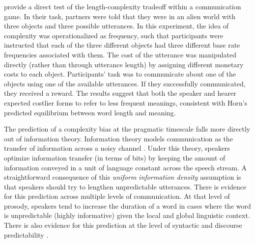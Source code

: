   provide a direct test of the length-complexity tradeoff within a communication game. In their task, partners were told that they were in an alien world with three objects and three possible utterances. In this experiment, the idea of complexity was operationalized as frequency, such that participants were instructed that each of the three different objects had three different base rate frequencies associated with them. The cost of the utterance was manipulated directly (rather than through utterance length) by assigning different monetary costs to each object. Participants' task was to communicate about one of the objects using one of the available utterances. If they successfully communicated, they received a reward. The results suggest that both the speaker and hearer expected costlier forms to refer to less frequent meanings, consistent with Horn's predicted equilibrium between word length and meaning.

The prediction of a complexity bias at the pragmatic timescale falls more directly out of information theory. Information theory models communication as the transfer of information across a noisy channel \cite{shannon1948}. Under this theory, speakers optimize information transfer (in terms of bits) by keeping the amount of information conveyed in a unit of language constant across the speech stream. A straightforward consequence of this {\it uniform information density} assumption is that speakers should try to lengthen unpredictable utterances. There is evidence for this prediction across multiple levels of communication. At that level of prosody, speakers tend to increase the duration of a word in cases where the word is unpredictable (highly informative) given the local \cite{aylett2004smooth} and global \cite{seyfarth2014word} linguistic context. There is also evidence for this prediction at the level of syntactic \cite{frank2008speaking} and discourse predictability \cite{genzel2002entropy}.

